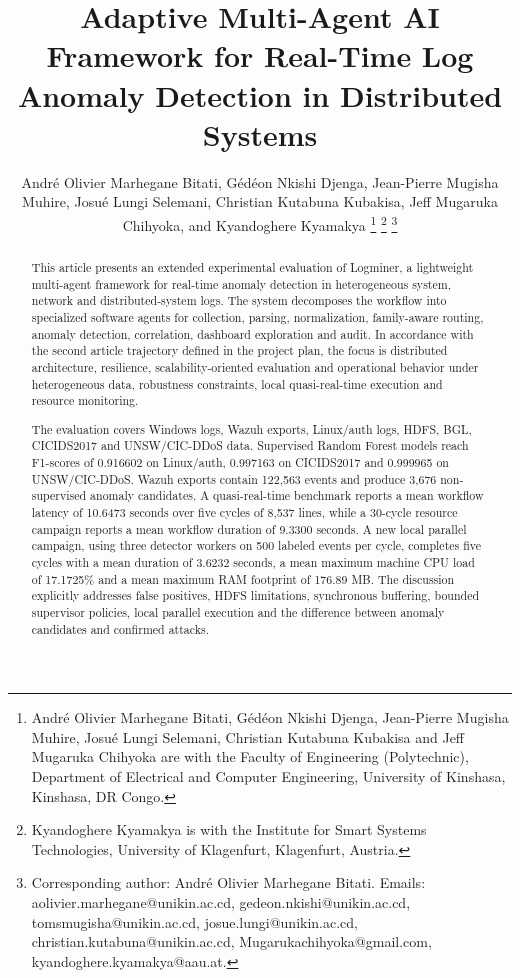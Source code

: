 \documentclass[journal]{IEEEtran}
\newcommand{\logminer}{Logminer}
\begin{document}
\title{Adaptive Multi-Agent AI Framework for Real-Time Log Anomaly Detection in Distributed Systems}

\author{Andr\'e Olivier Marhegane Bitati,
G\'ed\'eon Nkishi Djenga,
Jean-Pierre Mugisha Muhire,
Josu\'e Lungi Selemani,
Christian Kutabuna Kubakisa,
Jeff Mugaruka Chihyoka,
and Kyandoghere Kyamakya%
\thanks{Andr\'e Olivier Marhegane Bitati, G\'ed\'eon Nkishi Djenga, Jean-Pierre Mugisha Muhire, Josu\'e Lungi Selemani, Christian Kutabuna Kubakisa and Jeff Mugaruka Chihyoka are with the Faculty of Engineering (Polytechnic), Department of Electrical and Computer Engineering, University of Kinshasa, Kinshasa, DR Congo.}%
\thanks{Kyandoghere Kyamakya is with the Institute for Smart Systems Technologies, University of Klagenfurt, Klagenfurt, Austria.}%
\thanks{Corresponding author: Andr\'e Olivier Marhegane Bitati. Emails: aolivier.marhegane@unikin.ac.cd, gedeon.nkishi@unikin.ac.cd, tomsmugisha@unikin.ac.cd, josue.lungi@unikin.ac.cd, christian.kutabuna@unikin.ac.cd, Mugarukachihyoka@gmail.com, kyandoghere.kyamakya@aau.at.}}

\maketitle

\begin{abstract}
This article presents an extended experimental evaluation of \logminer, a lightweight multi-agent framework for real-time anomaly detection in heterogeneous system, network and distributed-system logs. The system decomposes the workflow into specialized software agents for collection, parsing, normalization, family-aware routing, anomaly detection, correlation, dashboard exploration and audit. In accordance with the second article trajectory defined in the project plan, the focus is distributed architecture, resilience, scalability-oriented evaluation and operational behavior under heterogeneous data, robustness constraints, local quasi-real-time execution and resource monitoring.

The evaluation covers Windows logs, Wazuh exports, Linux/auth logs, HDFS, BGL, CICIDS2017 and UNSW/CIC-DDoS data. Supervised Random Forest models reach F1-scores of 0.916602 on Linux/auth, 0.997163 on CICIDS2017 and 0.999965 on UNSW/CIC-DDoS. Wazuh exports contain 122,563 events and produce 3,676 non-supervised anomaly candidates. A quasi-real-time benchmark reports a mean workflow latency of 10.6473 seconds over five cycles of 8,537 lines, while a 30-cycle resource campaign reports a mean workflow duration of 9.3300 seconds. A new local parallel campaign, using three detector workers on 500 labeled events per cycle, completes five cycles with a mean duration of 3.6232 seconds, a mean maximum machine CPU load of 17.1725\% and a mean maximum RAM footprint of 176.89 MB. The discussion explicitly addresses false positives, HDFS limitations, synchronous buffering, bounded supervisor policies, local parallel execution and the difference between anomaly candidates and confirmed attacks.
\end{abstract}
\end{document}
